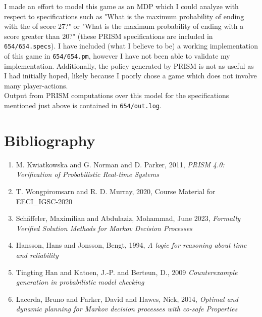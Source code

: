 \documentclass{article}
\begin{document}
I made an effort to model this game as an MDP which I could analyze with respect to specifications such as "What is the maximum probability of ending with the of score 27?" or "What is the maximum probability of ending with a score greater than 20?" (these PRISM specifications are included in \texttt{654/654.specs}). I have included (what I believe to be) a working implementation of this game in \texttt{654/654.pm}, however I have not been able to validate my implementation. Additionally, the policy generated by PRISM is not as useful as I had initially hoped, likely because I poorly chose a game which does not involve many player-actions. \\

Output from PRISM computations over this model for the specifications mentioned just above is contained in \texttt{654/out.log}.

\newpage
\section{Bibliography}

\begin{enumerate}
    \item M. Kwiatkowska and G. Norman and D. Parker, 2011, \textit{PRISM 4.0: Verification of Probabilistic Real-time Systems}
    \item T. Wongpiromsarn and R. D. Murray, 2020, Course Material for EECI\_IGSC-2020
    \item Schäffeler, Maximilian and Abdulaziz, Mohammad, June 2023, \textit{Formally Verified Solution Methods for Markov Decision Processes}
    \item Hansson, Hans and Jonsson, Bengt, 1994, \textit{A logic for reasoning about time 
    and reliability}
    \item Tingting Han and Katoen, J.-P. and Berteun, D., 2009 \textit{Counterexample generation in probabilistic model checking}
    \item Lacerda, Bruno and Parker, David and Hawes, Nick, 2014, \textit{Optimal and dynamic planning for Markov decision processes with co-safe Properties}
\end{enumerate}



\nocite{*}
\end{document}
